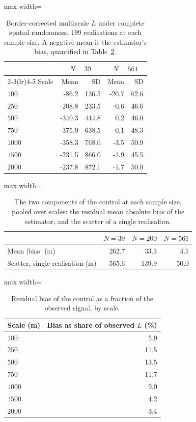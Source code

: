 \documentclass[fleqn,10pt]{wlpeerj}
\begin{document}
\begin{table}[H]
\centering
\caption{Border-corrected multiscale $L$ under complete spatial randomness, 199 realisations at each sample size. A negative mean is the estimator's bias, quantified in Table~\ref{si:envbias}.}
\label{si:env}
\small
\begin{adjustbox}{max width=\linewidth}
\begin{tabular}{lrrrr}
\toprule
 & \multicolumn{2}{c}{$N = 39$} & \multicolumn{2}{c}{$N = 561$} \\
\cmidrule(lr){2-3}\cmidrule(lr){4-5}
Scale & Mean & SD & Mean & SD \\
\midrule
$100$ & -86.2 & 136.5 & -20.7 & 62.6 \\
$250$ & -208.8 & 233.5 & -0.6 & 46.6 \\
$500$ & -340.3 & 444.8 & 0.2 & 46.0 \\
$750$ & -375.9 & 638.5 & -0.1 & 48.3 \\
$1000$ & -358.3 & 768.0 & -3.5 & 50.9 \\
$1500$ & -231.5 & 866.0 & -1.9 & 45.5 \\
$2000$ & -237.8 & 872.1 & -1.7 & 50.0 \\
\bottomrule
\end{tabular}
\end{adjustbox}
\end{table}

\begin{table}[H]
\centering
\caption{The two components of the control at each sample size, pooled over scales:
the residual mean absolute bias of the estimator, and the scatter of a single realisation.}
\label{si:envbias}
\small
\begin{adjustbox}{max width=\linewidth}
\begin{tabular}{lrrr}
\toprule
 & $N = 39$ & $N = 200$ & $N = 561$ \\
\midrule
Mean $|$bias$|$ (m) & 262.7 & 33.3 & 4.1 \\
Scatter, single realisation (m) & 565.6 & 139.9 & 50.0 \\
\bottomrule
\end{tabular}
\end{adjustbox}
\end{table}

\begin{table}[H]
\centering
\caption{Residual bias of the control as a fraction of the observed signal, by scale.}
\label{si:envfrac}
\small
\begin{adjustbox}{max width=\linewidth}
\begin{tabular}{lr}
\toprule
Scale (m) & Bias as share of observed $L$ (\%) \\
\midrule
$100$ & 5.9 \\
$250$ & 11.5 \\
$500$ & 13.5 \\
$750$ & 11.7 \\
$1000$ & 9.0 \\
$1500$ & 4.2 \\
$2000$ & 3.4 \\
\bottomrule
\end{tabular}
\end{adjustbox}
\end{table}
\end{document}
